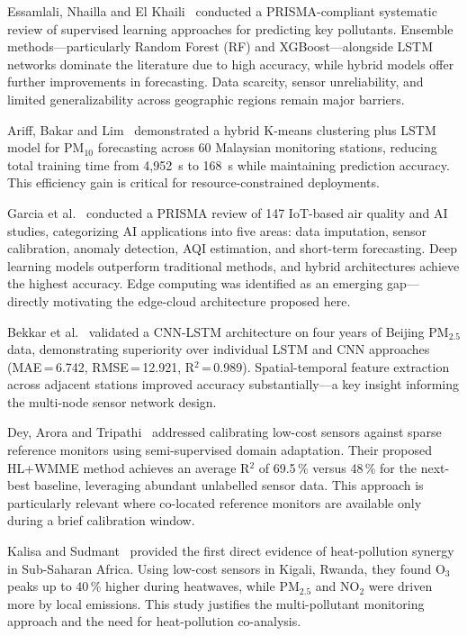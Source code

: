 \documentclass[12pt,a4paper]{report}
\begin{document}
Essamlali, Nhailla and El Khaili~\cite{essamlali2024} conducted a PRISMA-compliant systematic review of supervised learning approaches for predicting key pollutants. Ensemble methods—particularly Random Forest (RF) and XGBoost—alongside LSTM networks dominate the literature due to high accuracy, while hybrid models offer further improvements in forecasting. Data scarcity, sensor unreliability, and limited generalizability across geographic regions remain major barriers.

Ariff, Bakar and Lim~\cite{ariff2023} demonstrated a hybrid K-means clustering plus LSTM model for PM$_{10}$ forecasting across 60 Malaysian monitoring stations, reducing total training time from 4,952~s to 168~s while maintaining prediction accuracy. This efficiency gain is critical for resource-constrained deployments.

Garcia et al.~\cite{garcia2025} conducted a PRISMA review of 147 IoT-based air quality and AI studies, categorizing AI applications into five areas: data imputation, sensor calibration, anomaly detection, AQI estimation, and short-term forecasting. Deep learning models outperform traditional methods, and hybrid architectures achieve the highest accuracy. Edge computing was identified as an emerging gap—directly motivating the edge-cloud architecture proposed here.

Bekkar et al.~\cite{bekkar2021} validated a CNN-LSTM architecture on four years of Beijing PM$_{2.5}$ data, demonstrating superiority over individual LSTM and CNN approaches (MAE\,=\,6.742, RMSE\,=\,12.921, R$^2$\,=\,0.989). Spatial-temporal feature extraction across adjacent stations improved accuracy substantially—a key insight informing the multi-node sensor network design.

Dey, Arora and Tripathi~\cite{dey2022} addressed calibrating low-cost sensors against sparse reference monitors using semi-supervised domain adaptation. Their proposed HL+WMME method achieves an average R$^2$ of 69.5\,\% versus 48\,\% for the next-best baseline, leveraging abundant unlabelled sensor data. This approach is particularly relevant where co-located reference monitors are available only during a brief calibration window.

Kalisa and Sudmant~\cite{kalisa2024} provided the first direct evidence of heat-pollution synergy in Sub-Saharan Africa. Using low-cost sensors in Kigali, Rwanda, they found O$_3$ peaks up to 40\,\% higher during heatwaves, while PM$_{2.5}$ and NO$_2$ were driven more by local emissions. This study justifies the multi-pollutant monitoring approach and the need for heat-pollution co-analysis.
\end{document}
